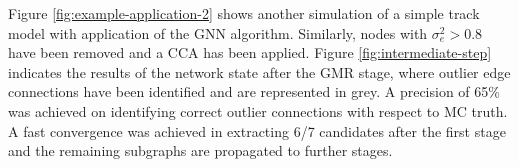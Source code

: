 Figure \ref{fig:example-application-2} shows another simulation of a simple track model with application of the GNN algorithm. Similarly, nodes with $\sigma_e^2 > 0.8$ have been removed and a CCA has been applied. Figure \ref{fig:intermediate-step} indicates the results of the network state after the GMR stage, where outlier edge connections have been identified and are represented in grey. A precision of 65\% was achieved on identifying correct outlier connections with respect to MC truth. A fast convergence was achieved in extracting 6/7 candidates after the first stage and the remaining subgraphs are propagated to further stages. 


\begin{center}
\begin{figure}[htbp]%
    \centering
    \hfill

\end{figure}
\end{center}
